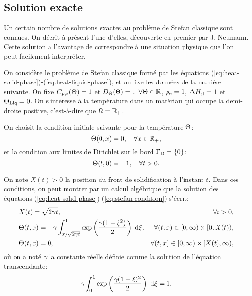 \subsection*{Solution exacte}
Un certain nombre de solutions exactes au problème de Stefan
classique sont connues. On décrit à présent l'une d'elles, découverte en
premier par J. Neumann. Cette solution a l'avantage de correspondre à
une situation physique que l'on peut facilement interpréter.

On considère le problème de Stefan classique formé par les équations
(\ref{eq:heat-solid-phase})-(\ref{eq:heat-liquid-phase}), et on fixe
les données de la manière suivante. On fixe
$C_{p,e}(\Theta) = 1$ et
$D_\Theta(\Theta)=1$ $\forall\Theta \in \mathbb
R$, $\rho_\mathrm{e} = 1$, $\Delta H_\mathrm{sl} = 1$ et $\Theta_\text{Liq} =
0$. On s'intéresse à la température dans un matériau qui occupe la
demi-droite positive, c'est-à-dire que $\Omega = \mathbb R_+$.

On choisit la condition initiale suivante pour la température
$\Theta$:
\begin{equation}
  \Theta(0, x) = 0, \quad \forall x\in\mathbb R_+,
\end{equation}
et la condition aux limites de Dirichlet sur le bord $\Gamma_\mathrm{D} =
\left\{ 0 \right\}$:
\begin{equation}
  \Theta(t, 0) = -1, \quad \forall t > 0.
\end{equation}

On note $X(t) > 0$ la position du front de solidification à l'instant
$t$. Dans ces conditions, on peut montrer par un calcul algébrique que
la solution des équations
(\ref{eq:heat-solid-phase})-(\ref{eq:stefan-condition}) s'écrit:
\begin{align}
  & X(t) = \sqrt{2\gamma t},& \forall t > 0,\label{eq:neumann-sol-frontier}\\
  & \temperature(t, x) = -\gamma\int_{x / \sqrt{2\gamma
      t}}^1\exp\parent{\frac{\gamma(1 - \xi^2)}{2}}\, \intd{\xi},%
  & \forall (t, x) \in [0,\infty)\times[0,X(t)),\label{eq:neumann-sol-solid-phase}\\
    & \temperature(t, x) = 0,
    & \forall (t, x) \in [0,\infty)\times[X(t), \infty),\label{eq:neumann-sol-liquid-phase}
\end{align}
où on a noté $\gamma$ la constante réelle définie comme la solution de
l'équation transcendante:
\begin{equation}
  \gamma \int_0^1\exp\left( \frac{\gamma(1 - \xi)^2}{2} \right)\,\,\mathrm d\xi
  = 1.
\end{equation}

